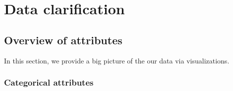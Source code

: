 %
%   
\clearpage
\section{Data clarification}
\label{section:data_clarify}








\subsection{Overview of attributes}

In this section, we provide a big picture of the our data via visualizations.

\subsubsection{Categorical attributes}

